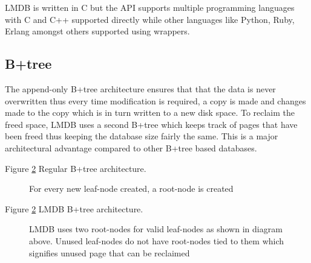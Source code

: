 \documentclass[9pt,twocolumn,twoside]{../../styles/osajnl}
\begin{document}
LMDB is written in C but the API supports multiple programming
languages with C and C++ supported directly while other languages like
Python, Ruby, Erlang amongst others supported using
wrappers\cite{www-lmdbwrap}.

\subsection{B+tree}

The append-only B+tree architecture ensures that that the data is
never overwritten thus every time modification is required, a copy is
made and changes made to the copy which is in turn written to a new
disk space. To reclaim the freed space, LMDB uses a second B+tree
which keeps track of pages that have been freed thus keeping the
database size fairly the same. This is a major architectural advantage
compared to other B+tree based databases.

Figure \ref{fig:false-color} Regular B+tree architecture.

\begin{figure}[htbp]
\centering
{}
\caption{For every new leaf-node created, a root-node is created}
\label{fig:false-color}
\end{figure}

Figure \ref{fig:false-color} LMDB B+tree architecture.

\begin{figure}[htbp]
\centering
{}
\caption{LMDB uses two root-nodes for valid leaf-nodes as shown in
  diagram above. Unused leaf-nodes do not have root-nodes tied to them
  which signifies unused page that can be reclaimed}
\label{fig:false-color}
\end{figure}
\end{document}
